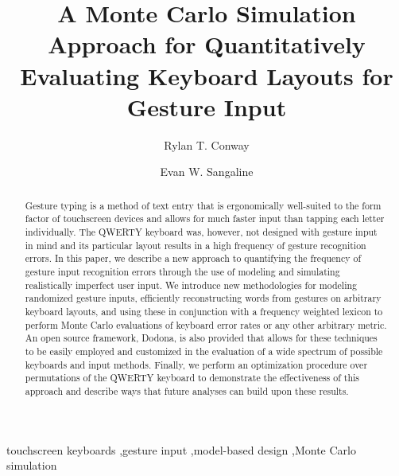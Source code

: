 \documentclass[final,1p,times,authoryear]{elsarticle}
\begin{document}
\begin{frontmatter}





\title{A Monte Carlo Simulation Approach for Quantitatively Evaluating  Keyboard Layouts for Gesture Input}

\author[label1]{Rylan T. Conway}
\author[label2]{Evan W. Sangaline}
\address[label1]{Physics Department, University of California, Davis, CA}
\address[label2]{National Superconducting Cyclotron Laboratory, Michigan State University, East Lansing, MI}





\begin{abstract}
Gesture typing is a method of text entry that is ergonomically well-suited to the form factor of touchscreen devices and allows for much faster input than tapping each letter individually.
The QWERTY keyboard was, however, not designed with gesture input in mind and its particular layout results in a high frequency of gesture recognition errors.
In this paper, we describe a new approach to quantifying the frequency of gesture input recognition errors through the use of modeling and simulating realistically imperfect user input.
We introduce new methodologies for modeling randomized gesture inputs, efficiently reconstructing words from gestures on arbitrary keyboard layouts, and using these in conjunction with a frequency weighted lexicon to perform Monte Carlo evaluations of keyboard error rates or any other arbitrary metric.
An open source framework, Dodona, is also provided that allows for these techniques to be easily employed and customized in the evaluation of a wide spectrum of possible keyboards and input methods.
Finally, we perform an optimization procedure over permutations of the QWERTY keyboard to demonstrate the effectiveness of this approach and describe ways that future analyses can build upon these results.
\end{abstract}

\begin{keyword}
touchscreen keyboards \sep gesture input \sep model-based design \sep Monte Carlo simulation






\end{keyword}

\end{frontmatter}
\end{document}
